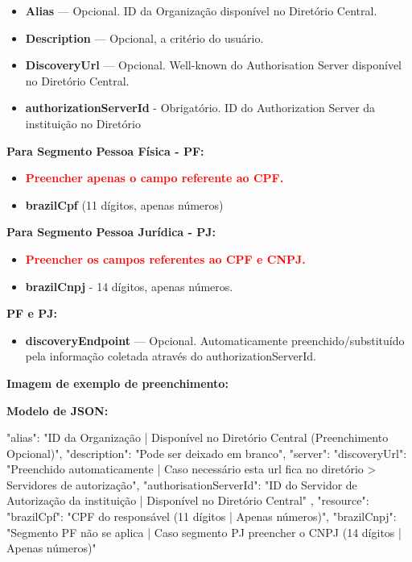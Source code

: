 \begin{itemize}
    \item \textbf{Alias} — Opcional. ID da Organização disponível no Diretório Central.
    \item \textbf{Description} — Opcional, a critério do usuário.
    \item \textbf{DiscoveryUrl} — Opcional. Well-known do Authorisation Server disponível no Diretório 
    Central.
    \item \textbf{\textcolor{red!80}{authorizationServerId}} - Obrigatório. ID do Authorization Server da instituição no Diretório
\end{itemize}

\textbf{Para Segmento Pessoa Física - PF:}

\begin{itemize}
    \item \textbf{\textcolor{red}{Preencher apenas o campo referente ao CPF.}}
    \item \textbf{\textcolor{red!80}{brazilCpf}} (11 dígitos, apenas números)
\end{itemize}

\textbf{Para Segmento Pessoa Jurídica - PJ:}
\begin{itemize}
    \item \textbf{\textcolor{red}{Preencher os campos referentes ao CPF e CNPJ.}}
    \item \textbf{\textcolor{red!80}{brazilCnpj}} - 14 dígitos, apenas números.
\end{itemize}

\textbf{PF e PJ:}

\begin{itemize}
    \item \textbf{discoveryEndpoint} — Opcional. Automaticamente preenchido/substituído pela informação coletada através do authorizationServerId.
\end{itemize}

\textbf{Imagem de exemplo de preenchimento:}

\begin{figure}[H]
    \centering
    \label{fig:portabilidadelonga}
\end{figure}

\textbf{Modelo de JSON:}

\begin{codeblock}
{
    "alias": "ID da Organização | Disponível no Diretório Central (Preenchimento Opcional)",
    "description": "Pode ser deixado em branco",
    "server": {
        "discoveryUrl": "Preenchido automaticamente | Caso necessário esta url fica no diretório > Servidores de autorização",
        "authorisationServerId": "ID do Servidor de Autorização da instituição | Disponível no Diretório Central"
    },
    "resource": {
        "brazilCpf": "CPF do responsável (11 dígitos | Apenas números)",
        "brazilCnpj": "Segmento PF não se aplica | Caso segmento PJ preencher o CNPJ (14 dígitos | Apenas números)"
    }
}
\end{codeblock}

